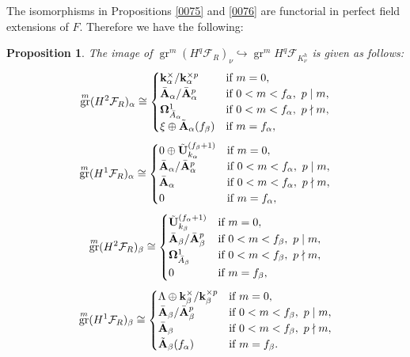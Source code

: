 \documentclass{amsart}
\newtheorem{Prop}[Thm]{Proposition}
\theoremstyle{remark}
\numberwithin{equation}{subsection}
\newcommand{\into}{\hookrightarrow}
\newcommand{\alg}[1]{\mathbf{#1}}
\DeclareMathOperator{\gr}{gr}
\begin{document}
The isomorphisms in Propositions
\ref{0075} and \ref{0076}
are functorial in perfect field extensions of $F$.
Therefore we have the following:

\begin{Prop} \label{0114}
	The image of
	$\gr^{m} (H^{q} \mathcal{F}_{R})_{\nu} \into \gr^{m} H^{q} \mathcal{F}_{K_{\nu}^{h}}$
	is given as follows:
		\[
				\gr^{m} (H^{2} \mathcal{F}_{R})_{\alpha}
			\cong
				\begin{cases}
							\alg{k}_{\alpha}^{\times} / \alg{k}_{\alpha}^{\times p}
					&	\text{if }
							m = 0,
					\\
							\Bar{\alg{A}}_{\alpha} / \Bar{\alg{A}}_{\alpha}^{p}
					&	\text{if }
							0 < m < f_{\alpha},\ p \mid m,
					\\
							\alg{\Omega}_{\Bar{A}_{\alpha}}^{1}
					&	\text{if }
							0 < m < f_{\alpha},\ p \nmid m,
					\\
							\xi \oplus \Tilde{\alg{A}}_{\alpha}(f_{\beta})
					&	\text{if }
							m = f_{\alpha},
				\end{cases}
		\]
		\[
				\gr^{m} (H^{1} \mathcal{F}_{R})_{\alpha}
			\cong
				\begin{cases}
							0 \oplus \Tilde{\alg{U}}_{k_{\alpha}}^{(f_{\beta} + 1)}
					&	\text{if }
							m = 0,
					\\
							\Bar{\alg{A}}_{\alpha} / \Bar{\alg{A}}_{\alpha}^{p}
					&	\text{if }
							0 < m < f_{\alpha},\ p \mid m,
					\\
							\Bar{\alg{A}}_{\alpha}
					&	\text{if }
							0 < m < f_{\alpha},\ p \nmid m,
					\\
							0
					&	\text{if }
							m = f_{\alpha},
				\end{cases}
		\]
		\[
				\gr^{m} (H^{2} \mathcal{F}_{R})_{\beta}
			\cong
				\begin{cases}
							\Tilde{\alg{U}}_{k_{\beta}}^{(f_{\alpha} + 1)}
					&	\text{if }
							m = 0,
					\\
							\Bar{\alg{A}}_{\beta} / \Bar{\alg{A}}_{\beta}^{p}
					&	\text{if }
							0 < m < f_{\beta},\ p \mid m,
					\\
							\alg{\Omega}_{\Bar{A}_{\beta}}^{1}
					&	\text{if }
							0 < m < f_{\beta},\ p \nmid m,
					\\
							0
					&	\text{if }
							m = f_{\beta},
				\end{cases}
		\]
		\[
				\gr^{m} (H^{1} \mathcal{F}_{R})_{\beta}
			\cong
				\begin{cases}
							\Lambda \oplus \alg{k}_{\beta}^{\times} / \alg{k}_{\beta}^{\times p}
					&	\text{if }
							m = 0,
					\\
							\Bar{\alg{A}}_{\beta} / \Bar{\alg{A}}_{\beta}^{p}
					&	\text{if }
							0 < m < f_{\beta},\ p \mid m,
					\\
							\Bar{\alg{A}}_{\beta}
					&	\text{if }
							0 < m < f_{\beta},\ p \nmid m,
					\\
							\Tilde{\alg{A}}_{\beta}(f_{\alpha})
					&	\text{if }
							m = f_{\beta}.
				\end{cases}
		\]
\end{Prop}
\end{document}
